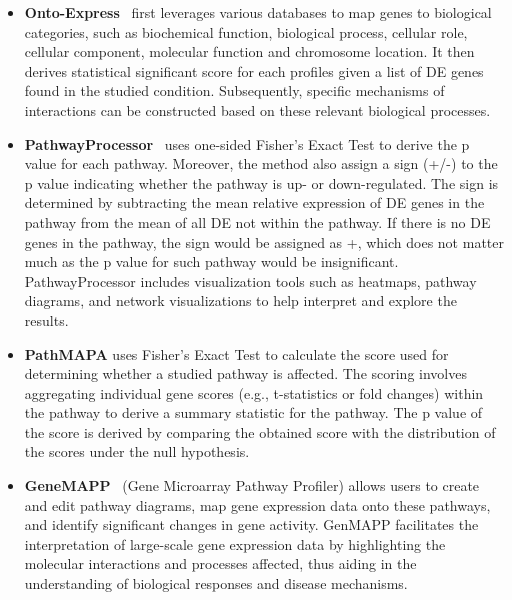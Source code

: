 \begin{itemize}
\item \textbf{Onto-Express}~\cite{Khatri:2002, DraghiciOE2:2003} first leverages various databases to map genes to biological categories, such as biochemical function, biological process, cellular role, cellular component, molecular function and chromosome location. It then derives statistical significant score for each profiles given a list of DE genes found in the studied condition. Subsequently, specific mechanisms of interactions can be constructed based on these relevant biological processes.

\item \textbf{PathwayProcessor}~\cite{Grosu:2002} uses one-sided Fisher's Exact Test to derive the p value for each pathway. Moreover, the method also assign a sign (+/-) to the p value indicating whether the pathway is up- or down-regulated. The sign is determined by subtracting the mean relative expression of DE genes in the pathway from the mean of all DE not within the pathway. If there is no DE genes in the pathway, the sign would be assigned as +, which does not matter much as the p value for such pathway would be insignificant. PathwayProcessor includes visualization tools such as heatmaps, pathway diagrams, and network visualizations to help interpret and explore the results.

\item \textbf{PathMAPA} \cite{Pan:2003} uses Fisher's Exact Test to calculate the score used for determining whether a studied pathway is affected. The scoring  involves aggregating individual gene scores (e.g., t-statistics or fold changes) within the pathway to derive a summary statistic for the pathway. The p value of the score is derived by comparing the obtained score with the distribution of the scores under the null hypothesis. 


%
%

\item \textbf{GeneMAPP}~\cite{Dahlquist:2002} (Gene Microarray Pathway Profiler) allows users to create and edit pathway diagrams, map gene expression data onto these pathways, and identify significant changes in gene activity. GenMAPP facilitates the interpretation of large-scale gene expression data by highlighting the molecular interactions and processes affected, thus aiding in the understanding of biological responses and disease mechanisms.


\end{itemize}
